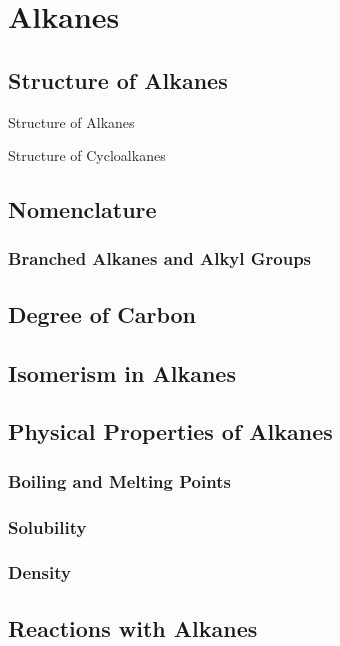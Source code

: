 \documentclass[../main]{subfiles}
\begin{document}
\section{Alkanes}

\subsection{Structure of Alkanes}

Structure of Alkanes

Structure of Cycloalkanes

\subsection{Nomenclature}

\subsubsection{Branched Alkanes and Alkyl Groups}

\subsection{Degree of Carbon}

\subsection{Isomerism in Alkanes}

\subsection{Physical Properties of Alkanes}

\subsubsection{Boiling and Melting Points}

\subsubsection{Solubility}

\subsubsection{Density}

\subsection{Reactions with Alkanes}
\end{document}

